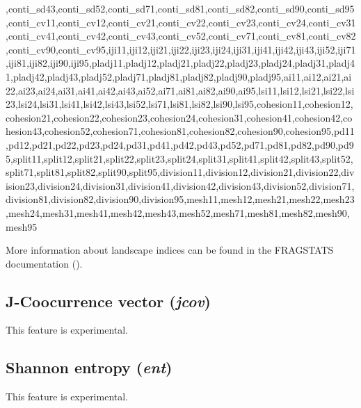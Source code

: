 ,conti_sd43,conti_sd52,conti_sd71,conti_sd81,conti_sd82,conti_sd90,conti_sd95,conti_cv11,conti_cv12,conti_cv21,conti_cv22,conti_cv23,conti_cv24,conti_cv31,conti_cv41,conti_cv42,conti_cv43,conti_cv52,conti_cv71,conti_cv81,conti_cv82,conti_cv90,conti_cv95,iji11,iji12,iji21,iji22,iji23,iji24,iji31,iji41,iji42,iji43,iji52,iji71,iji81,iji82,iji90,iji95,pladj11,pladj12,pladj21,pladj22,pladj23,pladj24,pladj31,pladj41,pladj42,pladj43,pladj52,pladj71,pladj81,pladj82,pladj90,pladj95,ai11,ai12,ai21,ai22,ai23,ai24,ai31,ai41,ai42,ai43,ai52,ai71,ai81,ai82,ai90,ai95,lsi11,lsi12,lsi21,lsi22,lsi23,lsi24,lsi31,lsi41,lsi42,lsi43,lsi52,lsi71,lsi81,lsi82,lsi90,lsi95,cohesion11,cohesion12,cohesion21,cohesion22,cohesion23,cohesion24,cohesion31,cohesion41,cohesion42,cohesion43,cohesion52,cohesion71,cohesion81,cohesion82,cohesion90,cohesion95,pd11,pd12,pd21,pd22,pd23,pd24,pd31,pd41,pd42,pd43,pd52,pd71,pd81,pd82,pd90,pd95,split11,split12,split21,split22,split23,split24,split31,split41,split42,split43,split52,split71,split81,split82,split90,split95,division11,division12,division21,division22,division23,division24,division31,division41,division42,division43,division52,division71,division81,division82,division90,division95,mesh11,mesh12,mesh21,mesh22,mesh23,mesh24,mesh31,mesh41,mesh42,mesh43,mesh52,mesh71,mesh81,mesh82,mesh90,mesh95



More information about landscape indices can be found in the FRAGSTATS documentation (\cite{mcgarigal2014fragstats}).

\subsection{J-Coocurrence vector ({\it jcov})}

This feature is experimental.

\subsection{Shannon entropy ({\it ent})}

This feature is experimental.